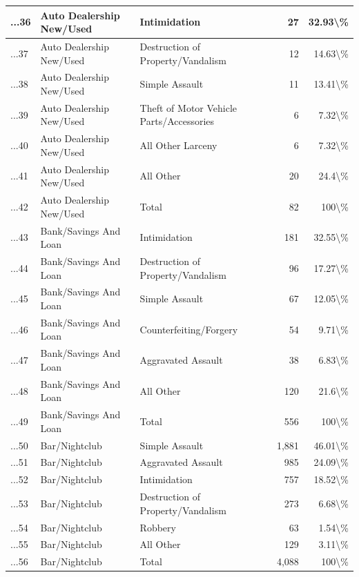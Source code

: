 \documentclass[
]{krantz}
\begin{document}
\begin{longtable}[t]{l|l|l|r|r}
\hline
...36 & Auto Dealership New/Used & Intimidation & 27 & 32.93\textbackslash{}\%\\
\hline
...37 & Auto Dealership New/Used & Destruction of Property/Vandalism & 12 & 14.63\textbackslash{}\%\\
\hline
...38 & Auto Dealership New/Used & Simple Assault & 11 & 13.41\textbackslash{}\%\\
\hline
...39 & Auto Dealership New/Used & Theft of Motor Vehicle Parts/Accessories & 6 & 7.32\textbackslash{}\%\\
\hline
...40 & Auto Dealership New/Used & All Other Larceny & 6 & 7.32\textbackslash{}\%\\
\hline
...41 & Auto Dealership New/Used & All Other & 20 & 24.4\textbackslash{}\%\\
\hline
...42 & Auto Dealership New/Used & Total & 82 & 100\textbackslash{}\%\\
\hline
...43 & Bank/Savings And Loan & Intimidation & 181 & 32.55\textbackslash{}\%\\
\hline
...44 & Bank/Savings And Loan & Destruction of Property/Vandalism & 96 & 17.27\textbackslash{}\%\\
\hline
...45 & Bank/Savings And Loan & Simple Assault & 67 & 12.05\textbackslash{}\%\\
\hline
...46 & Bank/Savings And Loan & Counterfeiting/Forgery & 54 & 9.71\textbackslash{}\%\\
\hline
...47 & Bank/Savings And Loan & Aggravated Assault & 38 & 6.83\textbackslash{}\%\\
\hline
...48 & Bank/Savings And Loan & All Other & 120 & 21.6\textbackslash{}\%\\
\hline
...49 & Bank/Savings And Loan & Total & 556 & 100\textbackslash{}\%\\
\hline
...50 & Bar/Nightclub & Simple Assault & 1,881 & 46.01\textbackslash{}\%\\
\hline
...51 & Bar/Nightclub & Aggravated Assault & 985 & 24.09\textbackslash{}\%\\
\hline
...52 & Bar/Nightclub & Intimidation & 757 & 18.52\textbackslash{}\%\\
\hline
...53 & Bar/Nightclub & Destruction of Property/Vandalism & 273 & 6.68\textbackslash{}\%\\
\hline
...54 & Bar/Nightclub & Robbery & 63 & 1.54\textbackslash{}\%\\
\hline
...55 & Bar/Nightclub & All Other & 129 & 3.11\textbackslash{}\%\\
\hline
...56 & Bar/Nightclub & Total & 4,088 & 100\textbackslash{}\%\\

\end{longtable}
\end{document}
